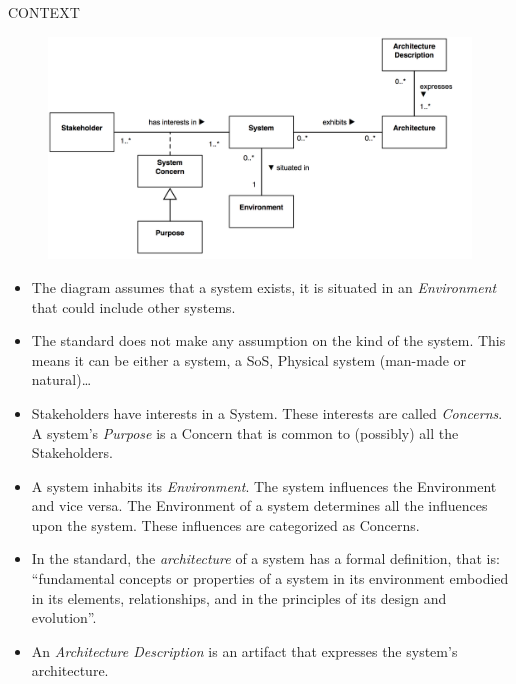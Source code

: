 		\begin{frame}
			\begin{center}
				\begin{LARGE}
					CONTEXT
				\end{LARGE}
			\end{center}
		\end{frame}
		
		\begin{frame}
					\begin{figure}
						\begin{center}
							\includegraphics[width=\textwidth]{img/ConceptualModelContext}
						\end{center}
					\end{figure}
		\end{frame}
		
		\begin{frame}
			\begin{itemize}
				\item The diagram assumes that a system exists, it is situated in an \emph{Environment} that could include other systems.
				\item The standard does not make any assumption on the kind of the system. This means it can be either a system, a SoS, Physical system (man-made or natural)\dots
				\item Stakeholders have interests in a System. These interests are called \emph{Concerns}. A system's \emph{Purpose} is a Concern that is common to (possibly) all the Stakeholders.
				\item A system inhabits its \emph{Environment}. The system influences the Environment and vice versa. The Environment of a system determines all the influences upon the system. These influences are categorized as Concerns.
				\item In the standard, the \emph{architecture} of a system has a formal definition, that is: “fundamental concepts or properties of a system in its environment embodied in its elements, relationships, and in the principles of its design and evolution”.
				\item An \emph{Architecture Description} is an artifact that expresses the system's architecture.
			\end{itemize}
		\end{frame}
		
